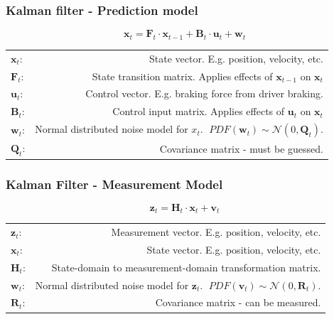 \documentclass[10pt]{beamer}
\begin{document}
\begin{frame}
  \frametitle{Kalman filter - Prediction model}
  \begin{equation}
    \mathbf{x}_t = \mathbf{F}_t\cdot \mathbf{x}_{t-1} + \mathbf{B}_t\cdot \mathbf{u}_t + \mathbf{w}_t
  \end{equation}
  \begin{table}
    \begin{tabular}{@{} lr @{}}
      \toprule
      $\mathbf{x}_t$: & State vector. E.g. position, velocity, etc. \\
      $\mathbf{F}_t$: & State transition matrix. Applies effects of $\textbf{x}_{t-1}$ on $\textbf{x}_t$\\
      $\mathbf{u}_t$: & Control vector. E.g. braking force from driver braking.\\
      $\mathbf{B}_t$: & Control input matrix. Applies effects of $\textbf{u}_{t}$ on $\textbf{x}_t$\\
      $\mathbf{w}_t$: & Normal distributed noise model for $x_t$. $\;PDF(\mathbf{w}_t) \sim \mathcal{N}(0,\mathbf{Q}_t)$.\\ 
      $\mathbf{Q}_t$: & Covariance matrix - must be guessed.\\
      \bottomrule
    \end{tabular}
  \end{table}
\end{frame}

\begin{frame}
  \frametitle{Kalman Filter - Measurement Model}
  \begin{equation}
    \mathbf{z}_t = \mathbf{H}_t\cdot \mathbf{x}_{t} + \mathbf{v}_t
  \end{equation}
  \begin{table}
    \begin{tabular}{@{} lr @{}}
      \toprule
      $\mathbf{z}_t$: & Measurement vector. E.g. position, velocity, etc. \\
      $\mathbf{x}_t$: & State vector. E.g. position, velocity, etc. \\
      $\mathbf{H}_t$: & State-domain to measurement-domain transformation matrix.\\
      $\mathbf{w}_t$: & Normal distributed noise model for $\mathbf{z}_t$. $\;PDF(\mathbf{v}_t) \sim \mathcal{N}(0,\mathbf{R}_t)$.\\ 
      $\mathbf{R}_t$: & Covariance matrix - can be measured.\\
      \bottomrule
    \end{tabular}
  \end{table}
\end{frame}
\end{document}
